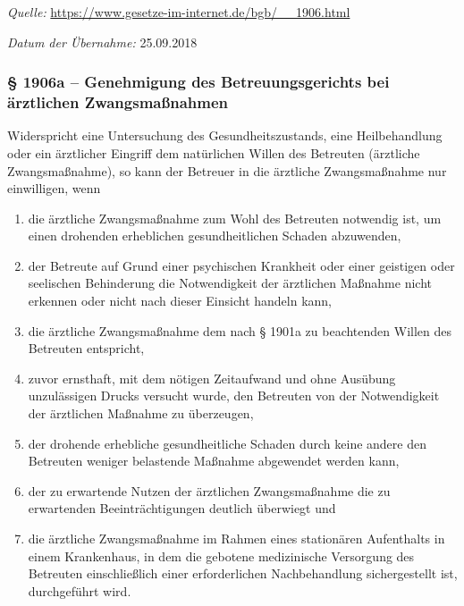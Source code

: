 \documentclass[pdftex,12pt,a4paper]{article}
\begin{document}
\textit{Quelle:} \url{https://www.gesetze-im-internet.de/bgb/__1906.html}

\textit{Datum der Übernahme:} 25.09.2018


\subsubsection*{§ 1906a -- Genehmigung des Betreuungsgerichts bei ärztlichen Zwangsmaßnahmen}

\begin{legal}

\item  Widerspricht eine Untersuchung des Gesundheitszustands, eine Heilbehandlung oder ein ärztlicher Eingriff dem natürlichen Willen des Betreuten (ärztliche Zwangsmaßnahme), so kann der Betreuer in die ärztliche Zwangsmaßnahme nur einwilligen, wenn

\begin{enumerate}
\item die ärztliche Zwangsmaßnahme zum Wohl des Betreuten notwendig ist, um einen drohenden erheblichen gesundheitlichen Schaden abzuwenden,

\item der Betreute auf Grund einer psychischen Krankheit oder einer geistigen oder seelischen Behinderung die Notwendigkeit der ärztlichen Maßnahme nicht erkennen oder nicht nach dieser Einsicht handeln kann,

\item die ärztliche Zwangsmaßnahme dem nach § 1901a zu beachtenden Willen des Betreuten entspricht,

\item zuvor ernsthaft, mit dem nötigen Zeitaufwand und ohne Ausübung unzulässigen Drucks versucht wurde, den Betreuten von der Notwendigkeit der ärztlichen Maßnahme zu überzeugen,

\item der drohende erhebliche gesundheitliche Schaden durch keine andere den Betreuten weniger belastende Maßnahme abgewendet werden kann,

\item der zu erwartende Nutzen der ärztlichen Zwangsmaßnahme die zu erwartenden Beeinträchtigungen deutlich überwiegt und

\item die ärztliche Zwangsmaßnahme im Rahmen eines stationären Aufenthalts in einem Krankenhaus, in dem die gebotene medizinische Versorgung des Betreuten einschließlich einer erforderlichen Nachbehandlung sichergestellt ist, durchgeführt wird.


\end{enumerate}
\end{legal}
\end{document}
